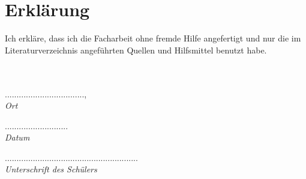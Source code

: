 \documentclass[a4paper, 12pt, bibtotocnumbered, liststotocnumbered]{scrartcl}
\begin{document}
	\section*{Erklärung}
	Ich erkläre, dass ich die Facharbeit ohne fremde Hilfe angefertigt und nur die im Literaturverzeichnis angeführten Quellen und Hilfsmittel benutzt habe.\\
	\\
	\\
	\begin{minipage}{3cm}
		..................................,\\
		\it{Ort}
	\end{minipage}
	\hspace{1.5cm}
	\begin{minipage}{2cm}
		...........................\\
		\it{Datum}
	\end{minipage}
	\hspace{1.5cm}
	\begin{minipage}{8cm}
		.........................................................\\
		\it{Unterschrift des Schülers}
	\end{minipage}
\end{document}
